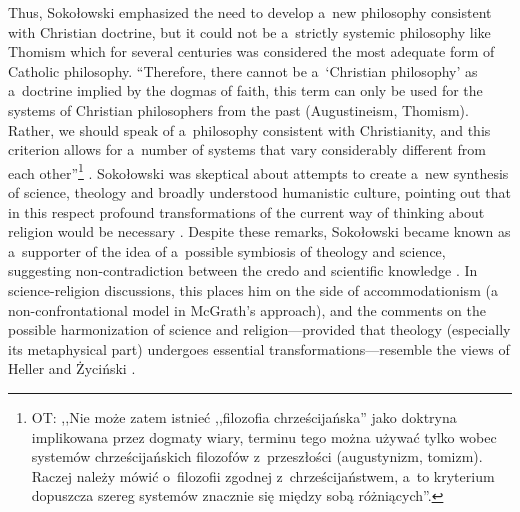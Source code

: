 \documentclass[%
  manuscript=article,
  year=2024,
  volume=77,
  doi=00000.000,
]{zfn}
\begin{document}
Thus, Sokołowski emphasized the need to develop a~new philosophy consistent with Christian doctrine, but it could not be a~strictly systemic philosophy like Thomism which for several centuries was considered the most adequate form of Catholic philosophy. ``Therefore, there cannot be a~‘Christian philosophy' as a~doctrine implied by the dogmas of faith, this term can only be used for the systems of Christian philosophers from the past (Augustineism, Thomism). Rather, we should speak of a~philosophy consistent with Christianity, and this criterion allows for a~number of systems that vary considerably different from each other''\footnote{OT: ,,Nie może zatem istnieć ,,filozofia chrześcijańska'' jako doktryna implikowana przez dogmaty wiary, terminu tego można używać tylko wobec systemów chrześcijańskich filozofów z~przeszłości (augustynizm, tomizm). Raczej należy mówić o~filozofii zgodnej z~chrześcijaństwem, a~to kryterium dopuszcza szereg systemów znacznie się między sobą różniących''.} 
\parencite[][p.199]{}. %
 Sokołowski was skeptical about attempts to create a~new synthesis of science, theology and broadly understood humanistic culture, pointing out that in this respect profound transformations of the current way of thinking about religion would be necessary 
\parencite[][p.265]{}. %
 Despite these remarks, Sokołowski became known as a~supporter of the idea of a~possible symbiosis of theology and science, suggesting non-contradiction between the credo and scientific knowledge 
\parencites[se e.g.,][p.214]{}[][p.180]{}. %
 In science-religion discussions, this places him on the side of accommodationism (a non-confrontational model in McGrath's approach), and the comments on the possible harmonization of science and religion---provided that theology (especially its metaphysical part) undergoes essential transformations---resemble the views of Heller and Życiński 
\parencite[see e.g.,][]{}.%
\end{document}
